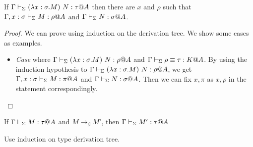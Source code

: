 \begin{lemma}
	\begin{item}
	      \item If $\G \V (\lambda x:\sigma.M)\ N: \tau@A$ then there are $x$ and $\rho$ such that
	      $\Gamma, x:\sigma \vdash_\Sigma M : \rho @A$ and $\Gamma \vdash_\Sigma N:\sigma @ A$.
	\end{item}
\end{lemma}

\begin{proof}
	We can prove using induction on the derivation tree.
	We show some cases as examples.
	\begin{itemize}
		\item \textit{Case} \TConv{} where $\G \V (\lambda x:\sigma.M)\ N: \rho@A$ and $\Gamma \vdash_\Sigma \rho \equiv \tau : K @A$.
			  By using the induction hypothesis to $\G \V (\lambda x:\sigma.M)\ N: \rho@A$, 
			  we get $\Gamma, x:\sigma \vdash_\Sigma M : \pi @A$ and $\Gamma \vdash_\Sigma N:\sigma @ A$.
		      Then we can fix $x, \pi$ as $x, \rho$ in the statement correspondingly.
	\end{itemize}
\end{proof}
	
\begin{theorem}
	If $\G\V M:\tau@A$ and $M \longrightarrow_{\beta} M'$, then $\G\V M':\tau@A$\\
\end{theorem}
	
Use induction on type derivation tree.
	
